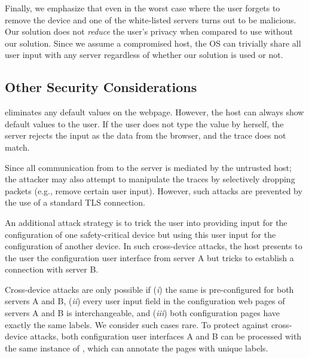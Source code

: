 Finally, we emphasize that even in the worst case where the user forgets to remove the device and one of the white-listed servers turns out to be malicious. Our solution does not \emph{reduce} the user's privacy when compared to use without our solution. Since we assume a compromised host, the OS can trivially share all user input with any server regardless of whether our solution is used or not.



\subsection{Other Security Considerations}

 \name eliminates any default values on the webpage. However, the host can always show default values to the user. If the user does not type the value by herself, the server rejects the input as the data from the browser, and the trace does not match.

 Since all communication from \device to the server is mediated by the untrusted host; the attacker may also attempt to manipulate the traces by selectively dropping packets (e.g., remove certain user input). However, such attacks are prevented by the use of a standard TLS connection.

 An additional attack strategy is to trick the user into providing input for the configuration of one safety-critical device but using this user input for the configuration of another device. In such cross-device attacks, the host presents to the user the configuration user interface from server A but tricks \device to establish a connection with server B.

Cross-device attacks are only possible if (\emph{i}) the same \device is pre-configured for both servers A and B, (\emph{ii}) every user input field in the configuration web pages of servers A and B is interchangeable, and (\emph{iii}) both configuration pages have exactly the same labels. We consider such cases rare. 
To protect against cross-device attacks, both configuration user interfaces A and B can be processed with the same instance of \tool, which can annotate the pages with unique labels.




